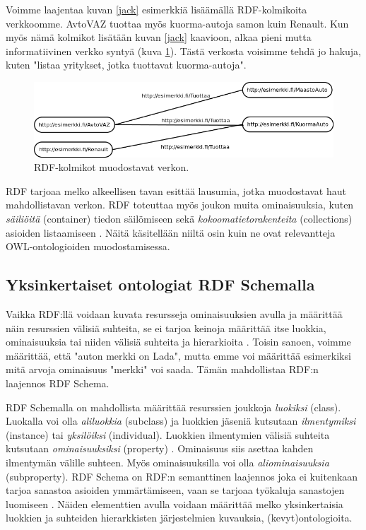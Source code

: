 \documentclass[finnish]{tktltiki2}
\theoremstyle{definition}
\theoremstyle{remark}
\begin{document}
Voimme laajentaa kuvan \ref{jack} esimerkkiä lisäämällä RDF-kolmikoita verkkoomme. AvtoVAZ tuottaa myös kuorma-autoja samon kuin Renault.
Kun myös nämä kolmikot lisätään kuvan \ref{jack} kaavioon, alkaa
pieni mutta informatiivinen verkko syntyä (kuva \ref{jack2}). Tästä verkosta voisimme
tehdä jo hakuja, kuten "listaa yritykset, jotka tuottavat kuorma-autoja".

\begin{figure}[h]
 \centering
 \includegraphics[scale=0.50]{torrance2.png}
 \caption{RDF-kolmikot muodostavat verkon.}
 \label{jack2}
\end{figure}

RDF tarjoaa melko alkeellisen tavan esittää lausumia, jotka
muodostavat haut mahdollistavan verkon. RDF toteuttaa myös joukon muita ominaisuuksia, kuten
\textit{säiliöitä} (container) tiedon säilömiseen sekä
\textit{kokoomatietorakenteita}
(collections) asioiden listaamiseen \cite{RDFP}. Näitä käsitellään
niiltä osin 
kuin ne ovat relevantteja OWL-ontologioiden muodostamisessa.  
 
\subsection{Yksinkertaiset ontologiat RDF Schemalla}

Vaikka RDF:llä voidaan kuvata resursseja ominaisuuksien avulla ja määrittää näin resurssien välisiä suhteita, se ei tarjoa keinoja määrittää itse luokkia, ominaisuuksia tai
niiden välisiä suhteita ja hierarkioita \cite{RDFS}. Toisin sanoen, voimme määrittää, että "auton merkki on Lada", mutta emme voi määrittää esimerkiksi mitä arvoja ominaisuus "merkki" voi saada.
Tämän mahdollistaa RDF:n laajennos RDF Schema. 

RDF Schemalla on mahdollista määrittää resurssien joukkoja \textit{luokiksi} (class).  Luokalla voi olla  \textit{aliluokkia} (subclass) ja luokkien jäseniä kutsutaan \textit{ilmentymiksi} (instance) tai \textit{yksilöiksi} (individual). Luokkien ilmentymien välisiä suhteita kutsutaan \textit{ominaisuuksiksi} (property) \cite{RDFS}. Ominaisuus siis asettaa kahden ilmentymän välille suhteen. Myös ominaisuuksilla voi olla \textit{aliominaisuuksia} (subproperty).
RDF Schema on RDF:n semanttinen laajennos joka ei kuitenkaan tarjoa sanastoa asioiden ymmärtämiseen, vaan se tarjoaa työkaluja sanastojen luomiseen \cite{RDFS}. Näiden elementtien avulla voidaan määrittää melko yksinkertaisia luokkien ja suhteiden hierarkkisten järjestelmien kuvauksia, (kevyt)ontologioita.  
\end{document}
